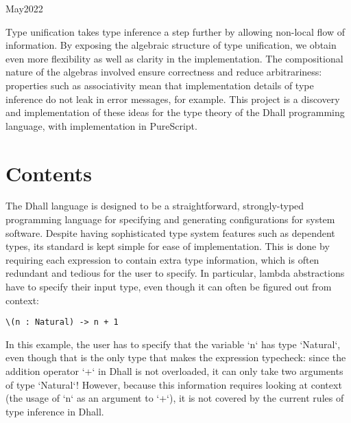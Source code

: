\documentclass[11pt, twoside, reqno]{book}
\makeatletter
\renewcommand\tableofcontents{%
    \if@twocolumn
      \@restonecoltrue\onecolumn
    \else
      \@restonecolfalse
    \fi
    \chapter*{\contentsname
        \@mkboth{%
           \contentsname}{\contentsname}}%
    \@starttoc{toc}%
    \if@restonecol\twocolumn\fi
    }
\newcommand{\resetspacing}{\doublespace}
\makeatother
\begin{document}
\renewcommand{\contentsname}{Contents}
\fancyhead[LE]{\textit{\nouppercase{\leftmark}}}
\fancyhead[RO]{\textit{\nouppercase{\rightmark}}}

    {May}{2022}

\abstr

Type unification takes type inference a step further by allowing non-local flow of information.
By exposing the algebraic structure of type unification, we obtain even more flexibility as well as clarity in the implementation.
The compositional nature of the algebras involved ensure correctness and reduce arbitrariness: properties such as associativity mean that implementation details of type inference do not leak in error messages, for example.
This project is a discovery and implementation of these ideas for the type theory of the Dhall programming language, with implementation in PureScript.


\tableofcontents





\startmain
\resetspacing

\intro

The Dhall language is designed to be a straightforward, strongly-typed programming language for specifying and generating configurations for system software.
Despite having sophisticated type system features such as dependent types, its standard is kept simple for ease of implementation.
This is done by requiring each expression to contain extra type information, which is often redundant and tedious for the user to specify.
In particular, lambda abstractions have to specify their input type, even though it can often be figured out from context:
\begin{verbatim}
\(n : Natural) -> n + 1
\end{verbatim}
In this example, the user has to specify that the variable \inHS`n` has type \inHS`Natural`, even though that is the only type that makes the expression typecheck: since the addition operator \inHS`+` in Dhall is not overloaded, it can only take two arguments of type \inHS`Natural`!
However, because this information requires looking at context (the usage of \inHS`n` as an argument to \inHS`+`), it is not covered by the current rules of type inference in Dhall.
\end{document}
